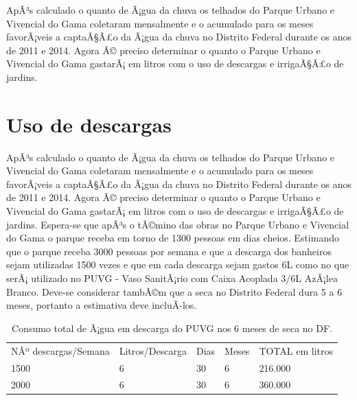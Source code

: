 	ApÃ³s calculado o quanto de Ã¡gua da chuva os telhados do Parque Urbano e Vivencial do Gama coletaram mensalmente e o acumulado para os meses favorÃ¡veis a captaÃ§Ã£o da Ã¡gua da chuva no Distrito Federal durante os anos de 2011 e 2014. Agora Ã© preciso determinar o quanto o Parque Urbano e Vivencial do Gama gastarÃ¡ em litros com o uso de descargas e irrigaÃ§Ã£o de jardins.  
	
\section{Uso de descargas}

	ApÃ³s calculado o quanto de Ã¡gua da chuva os telhados do Parque Urbano e Vivencial do Gama coletaram mensalmente e o acumulado para os meses favorÃ¡veis a captaÃ§Ã£o da Ã¡gua da chuva no Distrito Federal durante os anos de 2011 e 2014. Agora Ã© preciso determinar o quanto o Parque Urbano e Vivencial do Gama gastarÃ¡ em litros com o uso de descargas e irrigaÃ§Ã£o de jardins.  
	Espera-se que apÃ³s o tÃ©mino das obras no Parque Urbano e Vivencial do Gama o parque receba em torno de 1300 pessoas em dias cheios. Estimando que o parque receba 3000 pessoas por semana e que a descarga dos banheiros sejam utilizadas 1500 vezes e que em cada descarga sejam gastos 6L como no que serÃ¡ utilizado no PUVG - Vaso SanitÃ¡rio com Caixa Acoplada 3/6L AzÃ¡lea Branco. Deve-se considerar tambÃ©m que a seca no Distrito Federal dura 5 a 6 meses, portanto a estimativa deve incluÃ­-los. 
	
\begin{table}[h]
\centering
\caption{Consumo total de Ã¡gua em descarga do PUVG nos 6 meses de seca no DF.}
\label{Consumo total de Ã¡gua em descarga do PUVG nos 6 meses de seca no DF.}
\begin{tabular}{lllll}
 &  &  &  &  \\ \hline
\multicolumn{1}{|l|}{NÂº descargas/Semana} & \multicolumn{1}{l|}{Litros/Descarga} & \multicolumn{1}{l|}{Dias} & \multicolumn{1}{l|}{Meses} & \multicolumn{1}{l|}{TOTAL em litros} \\ \hline
\multicolumn{1}{|l|}{1500} & \multicolumn{1}{l|}{6} & \multicolumn{1}{l|}{30} & \multicolumn{1}{l|}{6} & \multicolumn{1}{l|}{216.000} \\ \hline
\multicolumn{1}{|l|}{2000} & \multicolumn{1}{l|}{6} & \multicolumn{1}{l|}{30} & \multicolumn{1}{l|}{6} & \multicolumn{1}{l|}{360.000} \\ \hline
\end{tabular}
\end{table}

